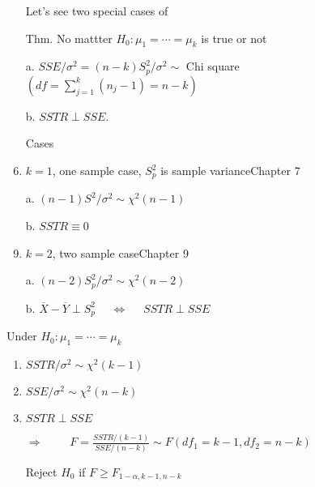 \begin{frame}[fragile]

	\begin{enumerate}
		\item[] Let's see two special cases of
			\vfill
	\item[Thm.] No mattter $H_0:\mu_1=\cdots=\mu_k$ is true or not
	\item[a.] $SSE/\sigma^2 = (n-k) S_p^2/\sigma^2\sim$ Chi square $(df=\sum_{j=1}^k(n_j-1) = n-k)$
	\item[b.] $SSTR \perp SSE$.
		\vfill
	\item[Cases]
			\setcounter{enumi}{0}
		\item $k=1$, one sample case, $S_p^2$ is sample variance\hfill {\small Chapter 7}\\[0.6em]
		\item[] a. $(n-1)S^2/\sigma^2\sim \chi^2(n-1)$
		\item[] b. $SSTR\equiv 0$\\[1em]
		\item $k=2$, two sample case\hfill {\small Chapter 9}\\[0.6em]
		\item[] a. $(n-2)S_p^2/\sigma^2 \sim\chi^2(n-2)$
		\item[] b. $\overline{X}-\overline{Y}\perp S_p^2$ $\quad\Longleftrightarrow\quad$ $SSTR\perp SSE$
	\end{enumerate}
\end{frame}
\begin{frame}[fragile]
Under $H_0: \mu_1=\cdots = \mu_k$
\begin{enumerate}
	\item $SSTR/\sigma^2 \sim \chi^2(k-1)$
	\item $SSE/\sigma^2 \sim \chi^2(n-k)$
	\item $SSTR\perp SSE$
		\vfill
	\item[$\Longrightarrow$] $\qquad \displaystyle F = \frac{SSTR/(k-1)}{SSE/(n-k)}\sim F(df_1=k-1,df_2=n-k)$
		\vfill
	\item[Reject] $H_0$ if $F\ge F_{1-\alpha,k-1,n-k}$
\end{enumerate}
\end{frame}

